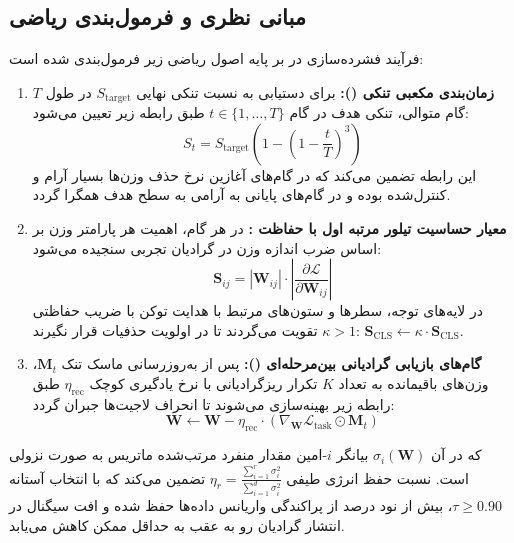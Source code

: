 \subsection{مبانی نظری و فرمول‌بندی ریاضی}
فرآیند فشرده‌سازی در  بر پایه اصول ریاضی زیر فرمول‌بندی شده است:
\begin{enumerate}
    \item \textbf{زمان‌بندی مکعبی تنکی ():} برای دستیابی به نسبت تنکی نهایی $S_{\text{target}}$ در طول $T$ گام متوالی، تنکی هدف در گام $t \in \{1, \dots, T\}$ طبق رابطه زیر تعیین می‌شود:
    \begin{equation}
    S_t = S_{\text{target}} \left( 1 - \left( 1 - \frac{t}{T} \right)^3 \right)
    \end{equation}
    این رابطه تضمین می‌کند که در گام‌های آغازین نرخ حذف وزن‌ها بسیار آرام و کنترل‌شده بوده و در گام‌های پایانی به آرامی به سطح هدف همگرا گردد.
    \item \textbf{معیار حساسیت تیلور مرتبه اول با حفاظت \lr{[CLS]}:} در هر گام، اهمیت هر پارامتر وزن بر اساس ضرب اندازه وزن در گرادیان تجربی سنجیده می‌شود:
    \begin{equation}
    \mathbf{S}_{ij} = |\mathbf{W}_{ij}| \cdot \left| \frac{\partial \mathcal{L}}{\partial \mathbf{W}_{ij}} \right|
    \end{equation}
    در لایه‌های توجه، سطرها و ستون‌های مرتبط با هدایت توکن \lr{[CLS]} با ضریب حفاظتی $\kappa > 1$ تقویت می‌گردند تا در اولویت حذفیات قرار نگیرند: $\mathbf{S}_{\text{CLS}} \leftarrow \kappa \cdot \mathbf{S}_{\text{CLS}}$.
    \item \textbf{گام‌های بازیابی گرادیانی بین‌مرحله‌ای ():} پس از به‌روزرسانی ماسک تنک $\mathbf{M}_t$، وزن‌های باقیمانده به تعداد $K$ تکرار ریزگرادیانی با نرخ یادگیری کوچک $\eta_{\text{rec}}$ طبق رابطه زیر بهینه‌سازی می‌شوند تا انحراف لاجیت‌ها جبران گردد:
    \begin{equation}
    \mathbf{W} \leftarrow \mathbf{W} - \eta_{\text{rec}} \cdot \left( \nabla_{\mathbf{W}} \mathcal{L}_{\text{task}} \odot \mathbf{M}_t \right)
    \end{equation}
\end{enumerate}

که در آن $\sigma_i(\mathbf{W})$ بیانگر $i$-امین مقدار منفرد مرتب‌شده ماتریس به صورت نزولی است. نسبت حفظ انرژی طیفی $\eta_r = \frac{\sum_{i=1}^r \sigma_i^2}{\sum_{i=1}^{d} \sigma_i^2}$ تضمین می‌کند که با انتخاب آستانه $\tau \ge 0.90$، بیش از نود درصد از پراکندگی واریانس داده‌ها حفظ شده و افت سیگنال در انتشار گرادیان رو به عقب به حداقل ممکن کاهش می‌یابد.


